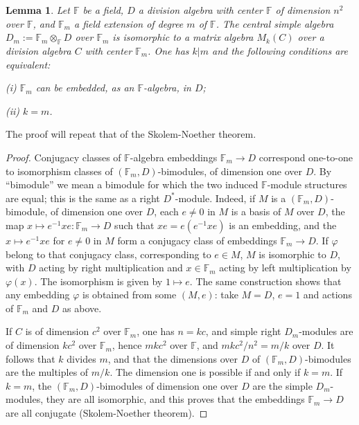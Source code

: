 \documentclass[11pt,a4paper]{article}
\theoremstyle{plain}
\newtheorem{lemma}[theorem]{Lemma}
\theoremstyle{definition}
\newcommand{\vp}{\varphi}
\begin{document}
\begin{lemma}\label{lem:skolem}
Let $\mathbb{F}$ be a field, $D$ a division algebra with center $\mathbb{F}$ of dimension $n^2$ over $\mathbb{F}$, and $\mathbb{F}_m$ a field extension of degree $m$ of $\mathbb{F}$. The central simple algebra $D_m := \mathbb{F}_m \otimes_{\mathbb{F}} D$ over $\mathbb{F}_m$ is isomorphic to a matrix algebra $M_k(C)$ over a division algebra $C$ with center $\mathbb{F}_m$. One has $k | m$ and the following conditions are equivalent:

\emph{(i)} $\mathbb{F}_m$ can be embedded, as an $\mathbb{F}$-algebra, in $D$;

\emph{(ii)} $k = m$.
\end{lemma}

The proof will repeat that of the Skolem-Noether theorem.

\begin{proof}
Conjugacy classes of $\mathbb{F}$-algebra embeddings $\mathbb{F}_m \to D$ correspond one-to-one to isomorphism classes of $(\mathbb{F}_m, D)$-bimodules, of dimension one over $D$. By ``bimodule'' we mean a bimodule for which the two induced $\mathbb{F}$-module structures are equal; this is the same as a right $D^*$-module. Indeed, if $M$ is a $(\mathbb{F}_m, D)$-bimodule, of dimension one over $D$, each $e \neq 0$ in $M$ is a basis of $M$ over $D$, the map $x \mapsto e^{-1}xe: \mathbb{F}_m \to D$ such that $xe = e(e^{-1}xe)$ is an embedding, and the $x \mapsto e^{-1}xe$ for $e \neq 0$ in $M$ form a conjugacy class of embeddings $\mathbb{F}_m \to D$. If $\vp$ belong to that conjugacy class, corresponding to $e \in M$, $M$ is isomorphic to $D$, with $D$ acting by right multiplication and $x \in \mathbb{F}_m$ acting by left multiplication by $\vp(x)$. The isomorphism is given by $1 \mapsto e$. The same construction shows that any embedding $\vp$ is obtained from some $(M,e)$: take $M=D$, $e=1$ and actions of $\mathbb{F}_m$ and $D$ as above.

If $C$ is of dimension $c^2$ over $\mathbb{F}_m$, one has $n = kc$, and simple right $D_m$-modules are of dimension $kc^2$ over $\mathbb{F}_m$, hence $mkc^2$ over $\mathbb{F}$, and $mkc^2/n^2 = m/k$ over $D$. It follows that $k$ divides $m$, and that the dimensions over $D$ of $(\mathbb{F}_m, D)$-bimodules are the multiples of $m/k$. The dimension one is possible if and only if $k=m$. If $k=m$, the $(\mathbb{F}_m, D)$-bimodules of dimension one over $D$ are the simple $D_m$-modules, they are all isomorphic, and this proves that the embeddings $\mathbb{F}_m \to D$ are all conjugate (Skolem-Noether theorem).
\end{proof}
\end{document}
